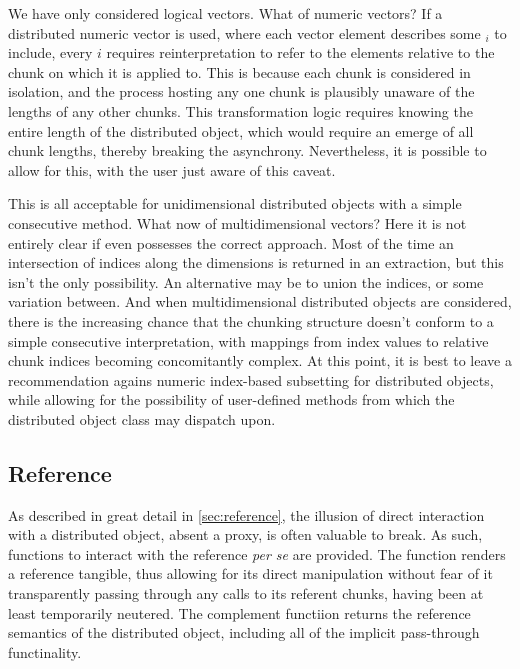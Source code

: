 We have only considered logical vectors.
What of numeric vectors?
If a distributed numeric vector is used, where each vector element describes some $_i$ to include, every $i$ requires reinterpretation to refer to the elements relative to the chunk on which it is applied to.
This is because each chunk is considered in isolation, and the process hosting any one chunk is plausibly unaware of the lengths of any other chunks.
This transformation logic requires knowing the entire length of the distributed object, which would require an emerge of all chunk lengths, thereby breaking the asynchrony.
Nevertheless, it is possible to allow for this, with the user just aware of this caveat.

This is all acceptable for unidimensional distributed objects with a simple consecutive  method.
What now of multidimensional vectors?
Here it is not entirely clear if \R even possesses the correct approach.
Most of the time an intersection of indices along the dimensions is returned in an extraction, but this isn't the only possibility.
An alternative may be to union the indices, or some variation between.
And when multidimensional distributed objects are considered, there is the increasing chance that the chunking structure doesn't conform to a simple consecutive interpretation, with mappings from index values to relative chunk indices becoming concomitantly complex.
At this point, it is best to leave a recommendation agains numeric index-based subsetting for distributed objects, while allowing for the possibility of user-defined methods from which the distributed object class may dispatch upon.

\subsection{Reference}

As described in great detail in \cref{sec:reference}, the illusion of direct interaction with a distributed object, absent a proxy, is often valuable to break.
As such, functions to interact with the reference \textit{per se} are provided.
The  function renders a reference tangible, thus allowing for its direct manipulation without fear of it transparently passing through any calls to its referent chunks, having been at least temporarily neutered.
The complement functiion  returns the reference semantics of the distributed object, including all of the implicit pass-through functinality.

